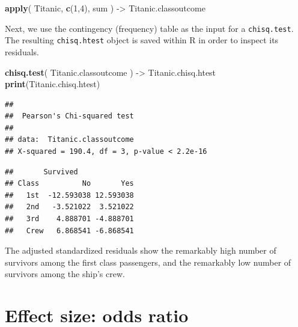 \documentclass[
]{book}
\newenvironment{Shaded}{\begin{snugshade}}{\end{snugshade}}
\newcommand{\CommentTok}[1]{\textcolor[rgb]{0.56,0.35,0.01}{\textit{#1}}}
\newcommand{\DecValTok}[1]{\textcolor[rgb]{0.00,0.00,0.81}{#1}}
\newcommand{\FunctionTok}[1]{\textcolor[rgb]{0.13,0.29,0.53}{\textbf{#1}}}
\newcommand{\NormalTok}[1]{#1}
\newcommand{\OtherTok}[1]{\textcolor[rgb]{0.56,0.35,0.01}{#1}}
\newcommand{\SpecialCharTok}[1]{\textcolor[rgb]{0.81,0.36,0.00}{\textbf{#1}}}
\begin{document}
\begin{Shaded}
\begin{Highlighting}[]
\FunctionTok{apply}\NormalTok{( Titanic, }\FunctionTok{c}\NormalTok{(}\DecValTok{1}\NormalTok{,}\DecValTok{4}\NormalTok{), sum ) }\OtherTok{{-}\textgreater{}}\NormalTok{ Titanic.classoutcome}
\end{Highlighting}
\end{Shaded}

Next, we use the contingency (frequency) table as the input for a \texttt{chisq.test}.
The resulting \texttt{chisq.htest} object is saved within R in order to inspect its residuals.

\begin{Shaded}
\begin{Highlighting}[]
\FunctionTok{chisq.test}\NormalTok{( Titanic.classoutcome ) }\OtherTok{{-}\textgreater{}}\NormalTok{ Titanic.chisq.htest}
\FunctionTok{print}\NormalTok{(Titanic.chisq.htest)}
\end{Highlighting}
\end{Shaded}

\begin{verbatim}
## 
##  Pearson's Chi-squared test
## 
## data:  Titanic.classoutcome
## X-squared = 190.4, df = 3, p-value < 2.2e-16
\end{verbatim}

\begin{Shaded}
\end{Shaded}

\begin{verbatim}
##       Survived
## Class          No       Yes
##   1st  -12.593038 12.593038
##   2nd   -3.521022  3.521022
##   3rd    4.888701 -4.888701
##   Crew   6.868541 -6.868541
\end{verbatim}

The adjusted standardized residuals show the remarkably high number of survivors among the first class passengers, and the remarkably low number of survivors among the ship's crew.

\hypertarget{effect-size-odds-ratio}{%
\section{Effect size: odds ratio}\label{effect-size-odds-ratio}}
\end{document}
